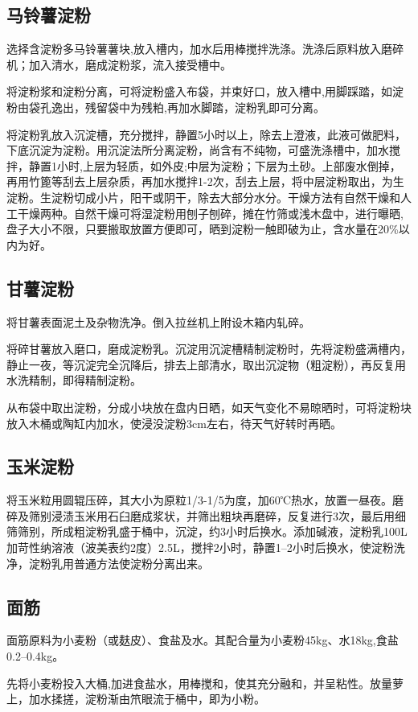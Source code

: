 \documentclass{ctexbook}
\begin{document}
\subsection{马铃薯淀粉}
选择含淀粉多马铃薯薯块,放入槽内，加水后用棒搅拌洗涤。洗涤后原料放入磨碎机；加入清水，磨成淀粉浆，流入接受槽中。

将淀粉浆和淀粉分离，可将淀粉盛入布袋，并束好口，放入槽中,用脚踩踏，如淀粉由袋孔逸出，残留袋中为残粕,再加水脚踏，淀粉乳即可分离。

将淀粉乳放入沉淀槽，充分搅拌，静置5小时以上，除去上澄液，此液可做肥料，下底沉淀为淀粉。用沉淀法所分离淀粉，尚含有不纯物，可盛洗涤槽中，加水搅拌，静置1小时,上层为轻质，如外皮;中层为淀粉；下层为土砂。上部废水倒掉，再用竹篦等刮去上层杂质，再加水搅拌1-2次，刮去上层，将中层淀粉取出，为生淀粉。生淀粉切成小片，阳干或阴干，除去大部分水分。干燥方法有自然干燥和人工干燥两种。自然干燥可将湿淀粉用刨子刨碎，摊在竹筛或浅木盘中，进行曝晒,盘子大小不限，只要搬取放置方便即可，晒到淀粉一触即破为止，含水量在20\%以内为好。
\subsection{甘薯淀粉}
将甘薯表面泥土及杂物洗净。倒入拉丝机上附设木箱内轧碎。

将碎甘薯放入磨口，磨成淀粉乳。沉淀用沉淀槽精制淀粉时，先将淀粉盛满槽内，静止一夜，等沉淀完全沉降后，排去上部清水，取出沉淀物（粗淀粉），再反复用水洗精制，即得精制淀粉。

从布袋中取出淀粉，分成小块放在盘内日晒，如天气变化不易晾晒时，可将淀粉块放入木桶或陶缸内加水，使浸没淀粉3cm左右，待天气好转时再晒。

\subsection{玉米淀粉}
将玉米粒用圆辊压碎，其大小为原粒1/3-1/5为度，加60℃热水，放置一昼夜。磨碎及筛别浸渍玉米用石臼磨成浆状，并筛出粗块再磨碎，反复进行3次，最后用细筛筛别，所成粗淀粉乳盛于桶中，沉淀，约3小时后换水。添加碱液，淀粉乳100L加苛性纳溶液（波美表约2度）2.5L，搅拌2小时，静置1--2小时后换水，使淀粉洗净，淀粉乳用普通方法使淀粉分离出来。
\subsection{面筋}
面筋原料为小麦粉（或麸皮）、食盐及水。其配合量为小麦粉45kg、水18kg,食盐0.2--0.4kg。

先将小麦粉投入大桶,加进食盐水，用棒搅和，使其充分融和，并呈粘性。放量萝上，加水揉搓，淀粉渐由笊眼流于桶中，即为小粉。
\end{document}
